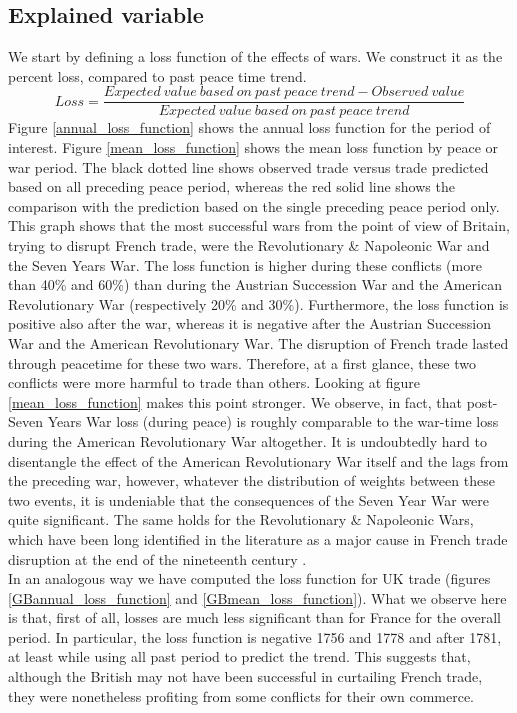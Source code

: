 \documentclass[12pt,a4paper,notitlepage,english]{article}
\begin{document}
\subsection{Explained variable}
We start by defining a loss function of the effects of wars.
We construct it as the percent loss, compared to past peace time trend.
\begin{equation*}
Loss = \frac{Expected \> value \> based \> on \>past \> peace \>trend - Observed \> value}{Expected \> value \> based \> on \>past \> peace \>trend}
\end{equation*}
Figure \ref{annual_loss_function} shows the annual loss function for the period of interest. Figure \ref{mean_loss_function} shows the mean loss function by peace or war period.
The black dotted line shows observed trade versus trade predicted based on all preceding peace period, whereas the red solid line shows the comparison with the prediction based on the single preceding peace period only.
This graph shows that the most successful wars from the point of view of Britain, trying to disrupt French trade, were the Revolutionary \& Napoleonic War and the Seven Years War.
The loss function is higher during these conflicts (more than 40\% and 60\%) than during the Austrian Succession War and the American Revolutionary War (respectively 20\% and 30\%).
Furthermore, the loss function is positive also after the war, whereas it is negative after the Austrian Succession War and the American Revolutionary War. The disruption of French trade lasted through peacetime for these two wars. 
Therefore, at a first glance, these two conflicts were more harmful to trade than others.
Looking at figure \ref{mean_loss_function} makes this point stronger.
We observe, in fact, that post-Seven Years War loss (during peace) is roughly comparable to the war-time loss during the American Revolutionary War altogether.
It is undoubtedly hard to disentangle the effect of the American Revolutionary War itself and the lags from the preceding war, however, whatever the distribution of weights between these two events, it is undeniable that the consequences of the Seven Year War were quite significant.
The same holds for the Revolutionary \& Napoleonic Wars, which have been long identified in the literature as a major cause in French trade disruption at the end of the nineteenth century \citep{ORourke2006}. \\
In an analogous way we have computed the loss function for UK trade (figures \ref{GBannual_loss_function} and \ref{GBmean_loss_function}). What we observe here is that, first of all, losses are much less significant than for France for the overall period. In particular, the loss function is negative 1756 and 1778 and after 1781, at least while using all past period to predict the trend. This suggests that, although the British may not have been successful in curtailing French trade, they were nonetheless profiting from some conflicts for their own commerce. 
\end{document}
